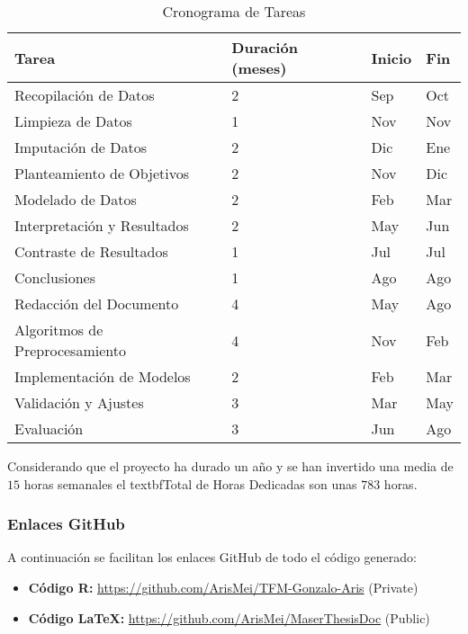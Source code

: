 \begin{table}[H]
    \centering
    \renewcommand{\arraystretch}{1.2} %
    \begin{tabular}{p{4cm} p{2.5cm} p{2.5cm} p{2.5cm}}
    \toprule
    \textbf{Tarea} & \textbf{Duración (meses)} & \textbf{Inicio} & \textbf{Fin} \\
    \midrule
    Recopilación de Datos          & 2 & Sep & Oct \\
    Limpieza de Datos              & 1 & Nov & Nov \\
    Imputación de Datos            & 2 & Dic & Ene \\
    Planteamiento de Objetivos     & 2 & Nov & Dic \\
    Modelado de Datos              & 2 & Feb & Mar \\
    Interpretación y Resultados    & 2 & May & Jun \\
    Contraste de Resultados        & 1 & Jul & Jul \\
    Conclusiones                   & 1 & Ago & Ago \\
    Redacción del Documento        & 4 & May & Ago \\
    Algoritmos de Preprocesamiento & 4 & Nov & Feb \\
    Implementación de Modelos      & 2 & Feb & Mar \\
    Validación y Ajustes           & 3 & Mar & May \\
    Evaluación                     & 3 & Jun & Ago \\
    \bottomrule
    \end{tabular}
    \caption{Cronograma de Tareas}\label{tab:gantt}
    \end{table}

Considerando que el proyecto ha durado un año y se han invertido una media de $15$ horas semanales el textbf{Total de Horas Dedicadas} son unas $783$ horas. 

\subsubsection{Enlaces GitHub}

A continuación se facilitan los enlaces GitHub de todo el código generado: 

\begin{itemize}
    \item \textbf{Código R:} \url{https://github.com/ArisMei/TFM-Gonzalo-Aris} (Private)
    \item \textbf{Código \LaTeX:} \url{https://github.com/ArisMei/MaserThesisDoc} (Public)
\end{itemize}

